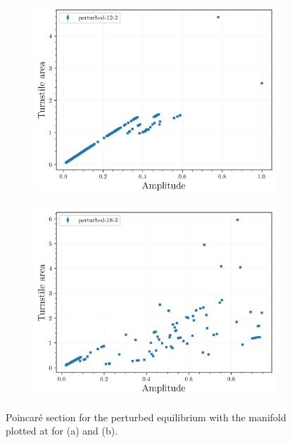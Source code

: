 \begin{figure}[H]
    \centering
    \begin{subfigure}{0.49\textwidth}
        \centering
        \includegraphics[width=\textwidth]{images/amplitudescan/turnstile_area_12_2.png}
        \caption{}
        \label{fig:scan-big1}
    \end{subfigure}
    \begin{subfigure}{0.49\textwidth}
        \centering
        \includegraphics[width=\textwidth]{images/amplitudescan/turnstile_area_18_3.png}
        \caption{}
        \label{fig:scan-wacky}
    \end{subfigure}
    \caption{Poincaré section for the perturbed equilibrium with the manifold plotted at for (a) and (b).}
    \label{fig:scan-big}
\end{figure}

